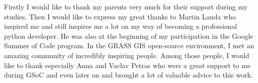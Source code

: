 \documentclass[a4paper,10pt,twoside]{article}
\begin{document}
Firstly I would like to thank my parents very much for their support during my studies. Then I would like to express my great thanks to Martin Landa who inspired me and still inspires me a lot on my way of becoming a professional python developer. He was also at the beginning of my participation in the Google Summer of Code program. In the GRASS GIS open-source environment, I met an amazing community of incredibly inspiring people. Among those people, I would like to thank especially Anna and Vaclav Petras who were a great support to me during GSoC and even later on and brought a lot of valuable advice to this work.


\newpage ~ \newpage
\thispagestyle{empty}


\newpage

\tableofcontents %
\newpage
\listoffigures %

\thispagestyle{empty}
\newcommand{\obrazek}[1]{(viz obr. \ref{#1})} %

\newpage
\pagestyle{fancy}


\renewcommand{\sectionmark}[1]{\markright{\ #1}}

\fancyhf{} %
\renewcommand{\headrulewidth}{0.4pt} %
\renewcommand{\footrulewidth}{0.4pt}  %
\addtolength{\voffset}{-0.4cm}

\fancyhead[RE, RO]{\nouppercase{\rightmark}}
   
\fancyfoot[RO, LE]{{\textsc{\small \thepage}}}

\fancypagestyle{plain}{
  \fancyhead{} %
  \renewcommand{\headrulewidth}{0pt} %
}



\newpage
\vspace*{-1cm}
\pagestyle{fancy}
\end{document}
